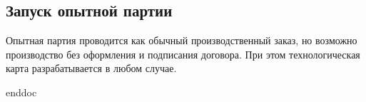 \newpage
\subsection{Запуск опытной партии}
%



Опытная партия проводится как обычный производственный заказ, но возможно производство без оформления и подписания договора. При этом технологическая карта разрабатывается в любом случае.


\clearpage

 {enddoc}
